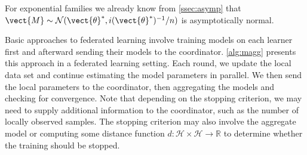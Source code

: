 For exponential families we already know from  \autoref{ssec:asymp} that $\vect{M} \sim \mathcal{N}(\vect{\theta}^*, i(\vect{\theta}^*)^{-1}/n)$ is asymptotically normal.

Basic approaches to federated learning involve training models on each learner first and afterward sending their models to the coordinator.
\autoref{alg:magg} presents this approach in a federated learning setting. 
Each round, we update the local data set and continue estimating the model parameters in parallel. 
We then send the local parameters to the coordinator, then aggregating the models and checking for convergence.
Note that depending on the stopping criterion, we may need to supply additional information to the coordinator, such as the number of locally observed samples. 
The stopping criterion may also involve the aggregate model or computing some distance function $d: \mathcal{H} \times \mathcal{H}  \rightarrow \mathbb{R}$  to determine whether the training should be stopped.
